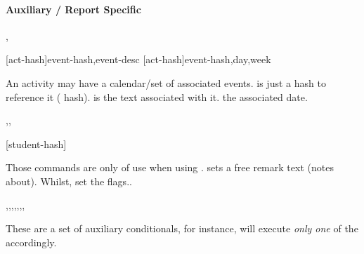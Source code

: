 \documentclass[article,nogeometry,english,tocdepth=3,secdepth=3]{ufrgscca} %
\begin{document}
\paragraph{Auxiliary / Report Specific}

\begin{codedescribe}[code,new=2023/11/18]{\ActivitySetNewEvent,\ActivitySetEventDay}
	\begin{codesyntax}%
    \tsmacro{\ActivitySetNewEvent}[act-hash]{event-hash,event-desc}
    \tsmacro{\ActivitySetEventDay}[act-hash]{event-hash,day,week}
	\end{codesyntax}
An activity may have a calendar/set of associated events.  is just a hash to reference it ( hash).  is the text associated with it.  the associated date.
\end{codedescribe}


\begin{codedescribe}[code,new=2023/11/18]{\studentremark,\studentnewpage,\distinctboard}
	\begin{codesyntax}%
		\tsmacro{\studentremark}{remarks}
		\tsmacro{\studentnewpage}[student-hash]{}
		\tsmacro{\distinctboard}{}
	\end{codesyntax}
Those commands are only of use when using . \tsmacro{\studentremark}{} sets a free remark text (notes about). Whilst, \tsobj{\distinctboard,\studentnewpage} set the  flags..
\end{codedescribe}


\begin{codedescribe}[code,new=2023/11/18,update=2023/12/02,update=2024/01/15,update=2024/02/22,update=2024/02/27]{\studentCase,\studentAdvCase,\studentCoadvCase,\studentDismissOtherCase,\studentNewPageCase,\studentDistinctBoardCase,\studentReviewerCase,\studentReviewerSetCase}
	\begin{codesyntax}%
	\end{codesyntax}
These are a set of auxiliary conditionals, for instance, \tsobj{\StudentCase} will execute \emph{only one} of the  accordingly.
\end{codedescribe}
\end{document}
